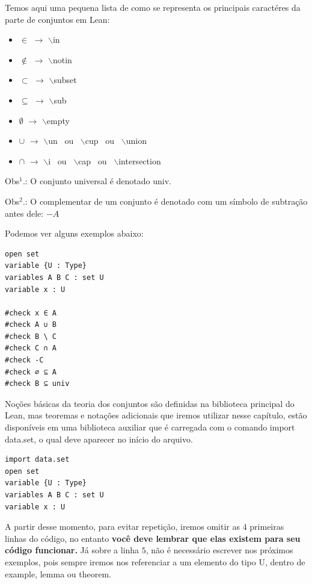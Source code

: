 Temos aqui uma pequena lista de como se representa os principais caractéres da parte de conjuntos em Lean:

\begin{itemize}
  \item $\in$ $\rightarrow$ $\backslash$in

  \item $\notin$ $\rightarrow$ $\backslash$notin

  \item $\subset$ $\rightarrow$ $\backslash$subset

  \item $\subseteq$ $\rightarrow$ $\backslash$sub

  \item $\emptyset$ $\rightarrow$ $\backslash$empty

  \item $\cup$ $\rightarrow$ $\backslash$un \ ou \ $\backslash$cup \ ou \ $\backslash$union

  \item $\cap$ $\rightarrow$ $\backslash$i \ ou \ $\backslash$cap \ ou \ $\backslash$intersection
\end{itemize}

Obs$^{1}$.: O conjunto universal é denotado { \selectfont univ}.

Obs$^{2}$.: O complementar de um conjunto é denotado com um símbolo de subtração antes dele: $-A$

Podemos ver alguns exemplos abaixo:
\begin{lstlisting}
open set
variable {U : Type}
variables A B C : set U
variable x : U

#check x ∈ A
#check A ∪ B
#check B \ C
#check C ∩ A
#check -C
#check ∅ ⊆ A
#check B ⊆ univ \end{lstlisting}

Noções básicas da teoria dos conjuntos são definidas na biblioteca principal do Lean, mas teoremas e notações adicionais que iremos utilizar nesse capítulo, estão disponíveis em uma biblioteca auxiliar que é carregada com o comando
{ \selectfont import data.set}, o qual deve aparecer no início do arquivo.

\begin{lstlisting}
import data.set
open set
variable {U : Type}
variables A B C : set U
variable x : U \end{lstlisting}

A partir desse momento, para evitar repetição, iremos omitir as $4$ primeiras linhas do código, no entanto \textbf{você deve lembrar que elas existem para seu código funcionar.} Já sobre a linha $5$, não é necessário escrever nos próximos exemplos, pois sempre iremos nos referenciar a um elemento do tipo{ \selectfont U}, dentro de {\selectfont example, lemma} ou {\selectfont theorem}.

